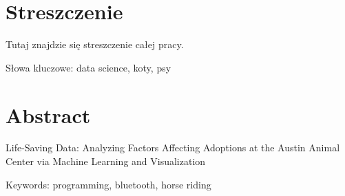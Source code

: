 \chapter*{Streszczenie}

Tutaj znajdzie się streszczenie całej pracy.

\vspace{20pt}
\noindent Słowa kluczowe: data science, koty, psy

\vspace{50pt}

\begingroup
\let\clearpage\relax
\chapter*{Abstract}
\endgroup

Life-Saving Data: Analyzing Factors Affecting Adoptions at the Austin Animal Center via Machine Learning and Visualization

\vspace{20pt}
\noindent Keywords: programming, bluetooth, horse riding
